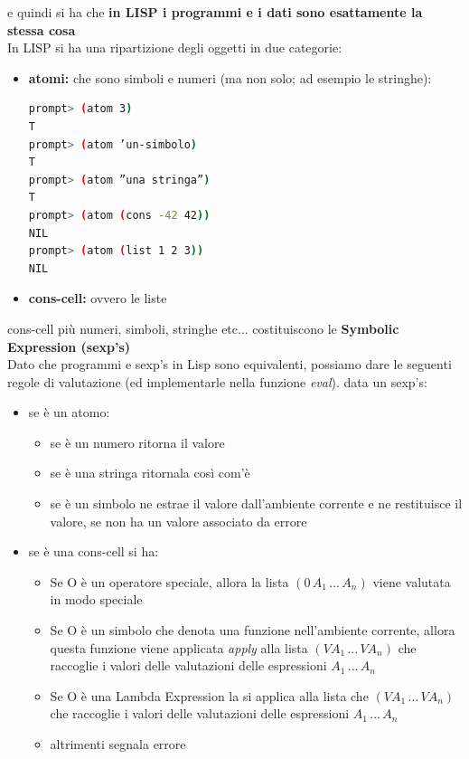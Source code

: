 \documentclass[a4paper,12pt, oneside]{book}
\begin{document}
e quindi si ha che \textbf{in LISP i programmi e i dati sono esattamente la stessa cosa}\\
In LISP si ha una ripartizione degli oggetti in due categorie:
\begin{itemize}
\item \textbf{atomi:} che sono simboli e numeri (ma non solo; ad esempio le stringhe):
\begin{shaded}
\begin{lstlisting}[language=bash]
prompt> (atom 3)
T
prompt> (atom ’un-simbolo)
T
prompt> (atom ”una stringa”)
T
prompt> (atom (cons -42 42))
NIL
prompt> (atom (list 1 2 3))
NIL
\end{lstlisting}
\end{shaded}
\item \textbf{cons-cell:} ovvero le liste
\end{itemize}
cons-cell più numeri, simboli, stringhe etc... costituiscono le \textbf{Symbolic Expression (sexp's)}\\
Dato che programmi e sexp’s in Lisp sono equivalenti, possiamo dare le seguenti regole di valutazione (ed implementarle nella funzione \textit{eval}). data un sexp's:
\begin{itemize}
\item se è un atomo:
\begin{itemize}
\item se è un numero ritorna il valore
\item se è una stringa ritornala così com'è
\item se è un simbolo ne estrae il valore dall'ambiente corrente e ne restituisce il valore, se non ha un valore associato da errore
\end{itemize}
\item se è una cons-cell si ha:
\begin{itemize}
\item Se O è un operatore speciale, allora la lista $(0\, A_1\,...\,A_n)$ viene valutata in modo speciale
\item Se O è un simbolo che denota una funzione nell'ambiente corrente, allora questa
funzione viene applicata \textit{apply} alla lista $(VA_1\,...\, VA_n)$ che raccoglie i
valori delle valutazioni delle espressioni $A_1\,...\,A_n$
\item Se O è una Lambda Expression la si applica alla lista che $(VA_1\,...\, VA_n)$
che raccoglie i valori delle valutazioni delle espressioni $A_1\,...\,A_n$
\item altrimenti segnala errore
\end{itemize}
\end{itemize}
\end{document}
